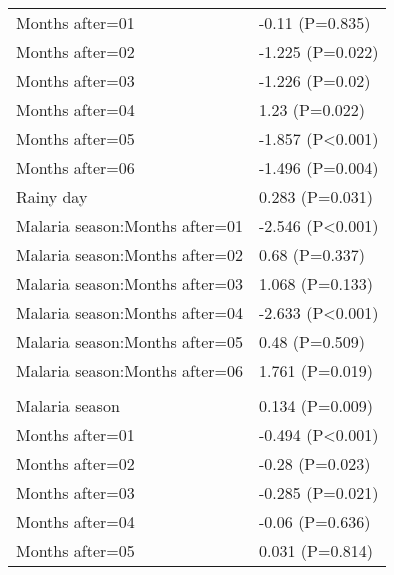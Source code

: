 \documentclass[]{article}
\begin{document}
\begin{longtable}[t]{ll}
\hspace{1em}Months after=01 & -0.11 (P=0.835)\\
\hspace{1em}Months after=02 & -1.225 (P=0.022)\\
\hspace{1em}Months after=03 & -1.226 (P=0.02)\\
\hspace{1em}Months after=04 & 1.23 (P=0.022)\\
\hspace{1em}Months after=05 & -1.857 (P<0.001)\\
\hspace{1em}Months after=06 & -1.496 (P=0.004)\\
\hspace{1em}Rainy day & 0.283 (P=0.031)\\
\hspace{1em}Malaria season:Months after=01 & -2.546 (P<0.001)\\
\hspace{1em}Malaria season:Months after=02 & 0.68 (P=0.337)\\
\hspace{1em}Malaria season:Months after=03 & 1.068 (P=0.133)\\
\hspace{1em}Malaria season:Months after=04 & -2.633 (P<0.001)\\
\hspace{1em}Malaria season:Months after=05 & 0.48 (P=0.509)\\
\hspace{1em}Malaria season:Months after=06 & 1.761 (P=0.019)\\
\addlinespace[1.5em]
\multicolumn{2}{l}{\textbf{Temporary field worker}}\\
\hspace{1em}Malaria season & 0.134 (P=0.009)\\
\hspace{1em}Months after=01 & -0.494 (P<0.001)\\
\hspace{1em}Months after=02 & -0.28 (P=0.023)\\
\hspace{1em}Months after=03 & -0.285 (P=0.021)\\
\hspace{1em}Months after=04 & -0.06 (P=0.636)\\
\hspace{1em}Months after=05 & 0.031 (P=0.814)\\

\end{longtable}
\end{document}
